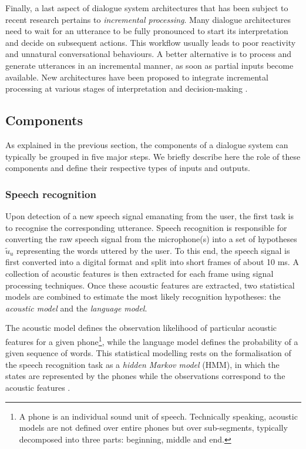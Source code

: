 Finally, a last aspect of dialogue system architectures that has been subject to recent research pertains to \textit{incremental processing}.  Many dialogue architectures need to wait for an utterance to be fully pronounced to start its interpretation and decide on subsequent actions.  This workflow usually leads to poor reactivity and unnatural conversational behaviours.  A better alternative is to process and generate utterances in an incremental manner, as soon as partial inputs become available. New architectures have been proposed to integrate incremental processing at various stages of interpretation and decision-making \citep{Brick:2007:INL:1228716.1228752,schlangen2009general,baumann2013:phd}.


\subsection{Components}

As explained in the previous section, the components of a dialogue system can typically be grouped in five major steps.  We briefly describe here the role of these components and define their respective types of inputs and outputs.

\subsubsection*{Speech recognition}
Upon detection of a new speech signal emanating from the user, the first task is to recognise the corresponding utterance. Speech recognition is responsible for converting the raw speech signal from the microphone(s) into a set of hypotheses $\tilde{u}_u$ representing the words uttered by the user. To this end, the speech signal is first converted into a digital format and split into short frames of about 10 ms. A collection of acoustic features is then extracted for each frame using signal processing techniques.  Once these acoustic features are extracted, two statistical models are combined to estimate the most likely recognition hypotheses: the \textit{acoustic model} and the \textit{language model}.  

The acoustic model defines the observation likelihood of particular acoustic features for a given phone\footnote{A phone is an individual sound unit of speech.  Technically speaking, acoustic models are not defined over entire phones but over sub-segments, typically decomposed into three parts: beginning, middle and end.}, while the language model defines the probability of a given sequence of words. This statistical modelling rests on the formalisation of the speech recognition task as a \textit{hidden Markov model} (HMM), in which the states are represented by the phones while the observations correspond to the acoustic features \citep{JuangRabiner:91}. 

